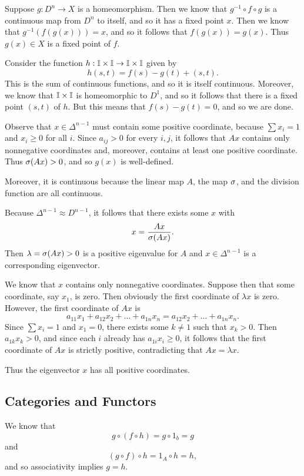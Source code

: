 \documentclass[../../solutions.tex]{subfiles}
\begin{document}
\begin{exercise} \leavevmode
Suppose $g:D^n\to X$ is a homeomorphism. Then we know that $g^{-1}\circ f\circ g$ is a continuous map from $D^n$ to itself, and so it has a fixed point $x$. Then we know that $g^{-1}(f(g(x)))=x$, and so it follows that $f(g(x))=g(x)$. Thus $g(x)\in X$ is a fixed point of $f$. 
\end{exercise} 

\begin{exercise} \leavevmode
Consider the function $h:\mathbb I\times\mathbb I\to\mathbb I\times\mathbb I$ given by \[h(s,t)=f(s)-g(t)+(s,t).\] This is the sum of continuous functions, and so it is itself continuous. Moreover, we know that $\mathbb I\times\mathbb I$ is homeomorphic to $D^1$, and so it follows that there is a fixed point $(s,t)$ of $h$. But this means that $f(s)-g(t)=0$, and so we are done. 
\end{exercise} 

\begin{exercise} \leavevmode
Observe that $x\in\Delta^{n-1}$ must contain some positive coordinate, because $\sum x_i=1$ and $x_i\ge0$ for all $i$. Since $a_{ij}>0$ for every $i,j$, it follows that $Ax$ contains only nonnegative coordinates and, moreover, contains at least one positive coordinate. Thus $\sigma(Ax)>0$, and so $g(x)$ is well-defined. 

Moreover, it is continuous because the linear map $A$, the map $\sigma$, and the division function are all continuous. 

Because $\Delta^{n-1}\approx D^{n-1}$, it follows that there exists some $x$ with \[x=\frac{Ax}{\sigma(Ax)}.\] Then $\lambda=\sigma(Ax)>0$ is a positive eigenvalue for $A$ and $x\in\Delta^{n-1}$ is a corresponding eigenvector. 

We know that $x$ contains only nonnegative coordinates. Suppose then that some coordinate, say $x_1$, is zero. Then obviously the first coordinate of $\lambda x$ is zero. However, the first coordinate of $Ax$ is \[a_{11}x_1+a_{12}x_2+\dots+a_{1n}x_n=a_{12}x_2+\dots+a_{1n}x_n.\] Since $\sum x_i=1$ and $x_1=0$, there exists some $k\ne1$ such that $x_k>0$. Then $a_{1k}x_k>0$, and since each $i$ already has $a_{1i}x_i\ge0$, it follows that the first coordinate of $Ax$ is strictly positive, contradicting that $Ax=\lambda x$. 

Thus the eigenvector $x$ has all positive coordinates. 
\end{exercise} 

\subsection{Categories and Functors} 
\begin{exercise} \leavevmode
We know that \[g\circ(f\circ h)=g\circ1_b=g\] and \[(g\circ f)\circ h=1_A\circ h=h,\] and so associativity implies $g=h$. 
\end{exercise} 
\end{document}
